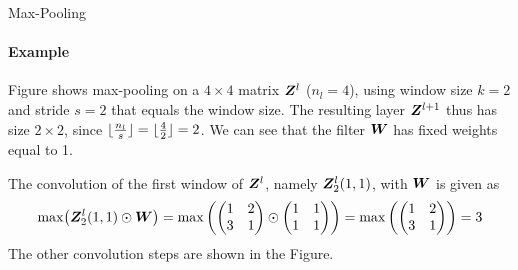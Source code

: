 %
\begin{frame}{Max-Pooling}
\framesubtitle{Example}
Figure shows max-pooling on a $4 \times 4$ matrix
    ${\boldsymbol Z}^l$ ($n_l=4$), using window size $k=2$ and stride $s=2$ that
    equals the window size. The resulting layer ${\boldsymbol Z}^{l+1}$ thus has
    size $2 \times 2$, since $\lfloor\tfrac{n_l}{s}\rfloor = \lfloor\tfrac{4}{2}\rfloor = 2$. 
    We can see that the filter ${\boldsymbol W}$ has fixed weights equal to 1. 

     The convolution of the 
    first window of ${\boldsymbol Z}^l$, namely ${\boldsymbol Z}^l_2(1,1)$, with ${\boldsymbol W}$
    is given as %
    \begin{align*}
        \max\bigl({\boldsymbol Z}^l_2(1,1) \odot {\boldsymbol W}\bigr) = 
        \max\left(
            \begin{pmatrix} 1 & 2\\3 & 1 \end{pmatrix} \odot \begin{pmatrix} 1 & 1\\1 & 1 \end{pmatrix}
        \right) = 
        \max\left( \begin{pmatrix} 1 & 2\\3& 1 \end{pmatrix}\right)  = 3
    \end{align*}
    The other convolution steps are shown in the Figure.
\end{frame}
%
%
%
%
